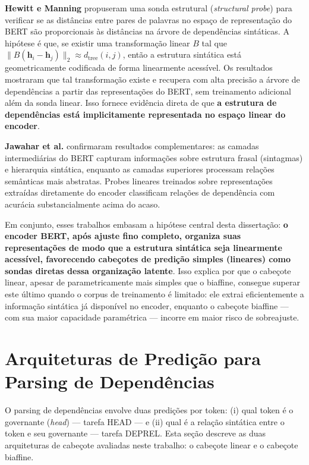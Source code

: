 \textbf{Hewitt e Manning} \cite{hewitt2019structural} propuseram uma sonda estrutural
(\textit{structural probe}) para verificar se as distâncias entre pares de palavras no espaço
de representação do BERT são proporcionais às distâncias na árvore de dependências sintáticas.
A hipótese é que, se existir uma transformação linear $B$ tal que
$\lVert B(\mathbf{h}_i - \mathbf{h}_j) \rVert_2 \approx d_{\text{tree}}(i, j)$, então a
estrutura sintática está geometricamente codificada de forma linearmente acessível. Os
resultados mostraram que tal transformação existe e recupera com alta precisão a árvore de
dependências a partir das representações do BERT, sem treinamento adicional além da sonda
linear. Isso fornece evidência direta de que \textbf{a estrutura de dependências está
implicitamente representada no espaço linear do encoder}.

\textbf{Jawahar et al.} \cite{jawahar2019does} confirmaram resultados complementares: as
camadas intermediárias do BERT capturam informações sobre estrutura frasal (sintagmas) e
hierarquia sintática, enquanto as camadas superiores processam relações semânticas mais
abstratas. Probes lineares treinados sobre representações extraídas diretamente do encoder
classificam relações de dependência com acurácia substancialmente acima do acaso.

Em conjunto, esses trabalhos embasam a hipótese central desta dissertação: \textbf{o encoder
BERT, após ajuste fino completo, organiza suas representações de modo que a estrutura
sintática seja linearmente acessível, favorecendo cabeçotes de predição simples (lineares)
como sondas diretas dessa organização latente}. Isso explica por que o cabeçote linear, apesar
de parametricamente mais simples que o biaffine, consegue superar este último quando o corpus
de treinamento é limitado: ele extrai eficientemente a informação sintática já disponível no
encoder, enquanto o cabeçote biaffine — com sua maior capacidade paramétrica — incorre em
maior risco de sobreajuste.

\section{Arquiteturas de Predição para Parsing de Dependências}
\label{sec:cabecotes}

O parsing de dependências envolve duas predições por token: (i) qual token é o governante
(\textit{head}) — tarefa HEAD — e (ii) qual é a relação sintática entre o token e seu
governante — tarefa DEPREL. Esta seção descreve as duas arquiteturas de cabeçote avaliadas
neste trabalho: o cabeçote linear e o cabeçote biaffine.


